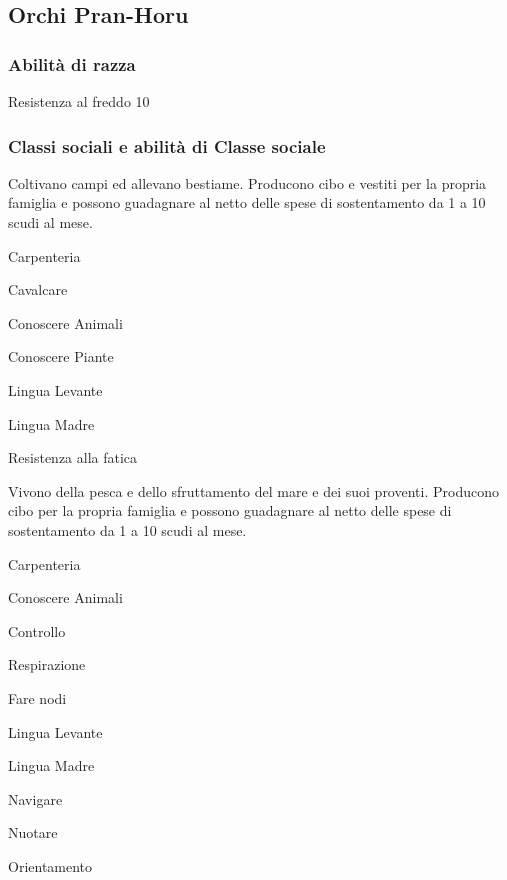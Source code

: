 \subsection{Orchi Pran-Horu}

\minmaxorchi

\subsubsection{Abilit\`a di razza}

\begin{abilist}
\item Resistenza al freddo 10
\end{abilist}


\subsubsection{Classi sociali e abilit\`a di Classe sociale}


Coltivano campi ed allevano bestiame. Producono cibo e vestiti per la
propria famiglia e possono guadagnare al netto delle spese di
sostentamento da 1 a 10 scudi al mese.

\begin{abilist}
\item Carpenteria
\item Cavalcare
\item Conoscere Animali
\item Conoscere Piante
\item Lingua Levante
\item Lingua Madre
\item Resistenza alla fatica
\end{abilist}


Vivono della pesca e dello sfruttamento del mare e dei suoi proventi.
Producono cibo per la propria famiglia e possono guadagnare al netto
delle spese di sostentamento da 1 a 10 scudi al mese.

\begin{abilist}
\item Carpenteria
\item Conoscere Animali
\item Controllo
\item Respirazione
\item Fare nodi
\item Lingua Levante
\item Lingua Madre
\item Navigare
\item Nuotare
\item Orientamento
\end{abilist}

